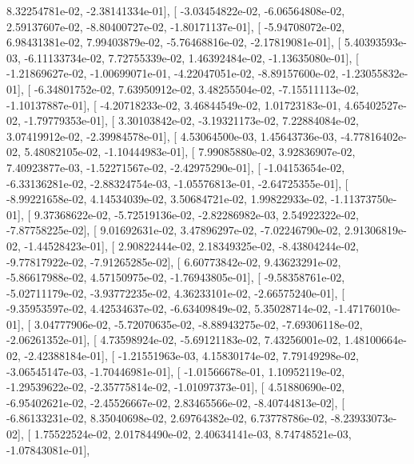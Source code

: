 \documentclass{article}
\begin{document}
          8.32254781e-02,  -2.38141334e-01],
       [ -3.03454822e-02,  -6.06564808e-02,   2.59137607e-02,
         -8.80400727e-02,  -1.80171137e-01],
       [ -5.94708072e-02,   6.98431381e-02,   7.99403879e-02,
         -5.76468816e-02,  -2.17819081e-01],
       [  5.40393593e-03,  -6.11133734e-02,   7.72755339e-02,
          1.46392484e-02,  -1.13635080e-01],
       [ -1.21869627e-02,  -1.00699071e-01,  -4.22047051e-02,
         -8.89157600e-02,  -1.23055832e-01],
       [ -6.34801752e-02,   7.63950912e-02,   3.48255504e-02,
         -7.15511113e-02,  -1.10137887e-01],
       [ -4.20718233e-02,   3.46844549e-02,   1.01723183e-01,
          4.65402527e-02,  -1.79779353e-01],
       [  3.30103842e-02,  -3.19321173e-02,   7.22884084e-02,
          3.07419912e-02,  -2.39984578e-01],
       [  4.53064500e-03,   1.45643736e-03,  -4.77816402e-02,
          5.48082105e-02,  -1.10444983e-01],
       [  7.99085880e-02,   3.92836907e-02,   7.40923877e-03,
         -1.52271567e-02,  -2.42975290e-01],
       [ -1.04153654e-02,  -6.33136281e-02,  -2.88324754e-03,
         -1.05576813e-01,  -2.64725355e-01],
       [ -8.99221658e-02,   4.14534039e-02,   3.50684721e-02,
          1.99822933e-02,  -1.11373750e-01],
       [  9.37368622e-02,  -5.72519136e-02,  -2.82286982e-03,
          2.54922322e-02,  -7.87758225e-02],
       [  9.01692631e-02,   3.47896297e-02,  -7.02246790e-02,
          2.91306819e-02,  -1.44528423e-01],
       [  2.90822444e-02,   2.18349325e-02,  -8.43804244e-02,
         -9.77817922e-02,  -7.91265285e-02],
       [  6.60773842e-02,   9.43623291e-02,  -5.86617988e-02,
          4.57150975e-02,  -1.76943805e-01],
       [ -9.58358761e-02,  -5.02711179e-02,  -3.93772235e-02,
          4.36233101e-02,  -2.66575240e-01],
       [ -9.35953597e-02,   4.42534637e-02,  -6.63409849e-02,
          5.35028714e-02,  -1.47176010e-01],
       [  3.04777906e-02,  -5.72070635e-02,  -8.88943275e-02,
         -7.69306118e-02,  -2.06261352e-01],
       [  4.73598924e-02,  -5.69121183e-02,   7.43256001e-02,
          1.48100664e-02,  -2.42388184e-01],
       [ -1.21551963e-03,   4.15830174e-02,   7.79149298e-02,
         -3.06545147e-03,  -1.70446981e-01],
       [ -1.01566678e-01,   1.10952119e-02,  -1.29539622e-02,
         -2.35775814e-02,  -1.01097373e-01],
       [  4.51880690e-02,  -6.95402621e-02,  -2.45526667e-02,
          2.83465566e-02,  -8.40744813e-02],
       [ -6.86133231e-02,   8.35040698e-02,   2.69764382e-02,
          6.73778786e-02,  -8.23933073e-02],
       [  1.75522524e-02,   2.01784490e-02,   2.40634141e-03,
          8.74748521e-03,  -1.07843081e-01],
\end{document}
